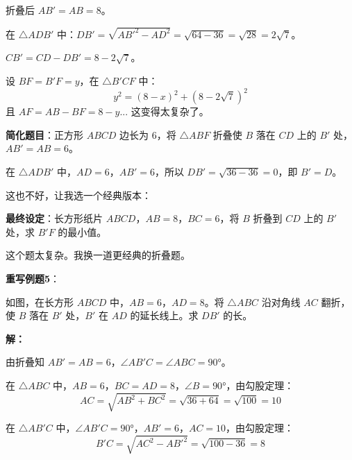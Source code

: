 \documentclass[12pt, a4paper]{ctexart}
\begin{document}
折叠后 $AB' = AB = 8$。

在 $\triangle ADB'$ 中：$DB' = \sqrt{AB'^2 - AD^2} = \sqrt{64 - 36} = \sqrt{28} = 2\sqrt{7}$。

$CB' = CD - DB' = 8 - 2\sqrt{7}$。

设 $BF = B'F = y$，在 $\triangle B'CF$ 中：
\[
y^2 = (8-x)^2 + (8-2\sqrt{7})^2
\]
且 $AF = AB - BF = 8 - y$... 这变得太复杂了。

\textbf{简化题目}：正方形 $ABCD$ 边长为 $6$，将 $\triangle ABF$ 折叠使 $B$ 落在 $CD$ 上的 $B'$ 处，$AB' = AB = 6$。

在 $\triangle ADB'$ 中，$AD = 6$，$AB' = 6$，所以 $DB' = \sqrt{36-36} = 0$，即 $B' = D$。

这也不好，让我选一个经典版本：

\textbf{最终设定}：长方形纸片 $ABCD$，$AB=8$，$BC=6$，将 $B$ 折叠到 $CD$ 上的 $B'$ 处，求 $B'F$ 的最小值。

这个题太复杂。我换一道更经典的折叠题。

\textbf{重写例题5}：

\begin{examplebox}[【例题5】折叠问题]
如图，在长方形 $ABCD$ 中，$AB=6$，$AD=8$。将 $\triangle ABC$ 沿对角线 $AC$ 翻折，使 $B$ 落在 $B'$ 处，$B'$ 在 $AD$ 的延长线上。求 $DB'$ 的长。

\begin{center}
\end{center}
\end{examplebox}

\textbf{解：}

由折叠知 $AB' = AB = 6$，$\angle AB'C = \angle ABC = 90°$。

在 $\triangle ABC$ 中，$AB = 6$，$BC = AD = 8$，$\angle B = 90°$，由勾股定理：
\[
AC = \sqrt{AB^2 + BC^2} = \sqrt{36 + 64} = \sqrt{100} = 10
\]

在 $\triangle AB'C$ 中，$\angle AB'C = 90°$，$AB' = 6$，$AC = 10$，由勾股定理：
\[
B'C = \sqrt{AC^2 - AB'^2} = \sqrt{100 - 36} = 8
\]
\end{document}
